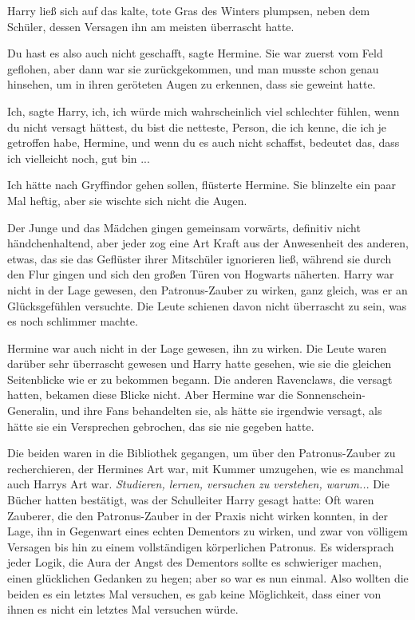 Harry ließ sich auf das kalte, tote Gras des Winters plumpsen, neben dem
Schüler, dessen Versagen ihn am meisten überrascht hatte.

\glqq{}Du hast es also auch nicht geschafft\grqq{}, sagte Hermine. Sie war zuerst
vom Feld geflohen, aber dann war sie zurückgekommen, und man musste schon genau
hinsehen, um in ihren geröteten Augen zu erkennen, dass sie geweint hatte.

\glqq{}Ich\grqq{}, sagte Harry, \glqq{}ich, ich würde mich wahrscheinlich viel
schlechter fühlen, wenn du nicht versagt hättest, du bist die netteste, Person,
die ich kenne, die ich je getroffen habe, Hermine, und wenn du es auch nicht
schaffst, bedeutet das, dass ich vielleicht noch, gut bin ...\grqq{}

\glqq{}Ich hätte nach Gryffindor gehen sollen\grqq{}, flüsterte Hermine. Sie
blinzelte ein paar Mal heftig, aber sie wischte sich nicht die Augen.

Der Junge und das Mädchen gingen gemeinsam vorwärts, definitiv nicht
händchenhaltend, aber jeder zog eine Art Kraft aus der Anwesenheit des anderen,
etwas, das sie das Geflüster ihrer Mitschüler ignorieren ließ, während sie durch
den Flur gingen und sich den großen Türen von Hogwarts näherten. Harry war nicht
in der Lage gewesen, den Patronus-Zauber zu wirken, ganz gleich, was er an
Glücksgefühlen versuchte. Die Leute schienen davon nicht überrascht zu sein, was
es noch schlimmer machte.

Hermine war auch nicht in der Lage gewesen, ihn zu wirken. Die Leute waren
darüber sehr überrascht gewesen und Harry hatte gesehen, wie sie die gleichen
Seitenblicke wie er zu bekommen begann. Die anderen Ravenclaws, die versagt
hatten, bekamen diese Blicke nicht. Aber Hermine war die Sonnenschein-Generalin,
und ihre Fans behandelten sie, als hätte sie irgendwie versagt, als hätte sie
ein Versprechen gebrochen, das sie nie gegeben hatte.

Die beiden waren in die Bibliothek gegangen, um über den Patronus-Zauber zu
recherchieren, der Hermines Art war, mit Kummer umzugehen, wie es manchmal auch
Harrys Art war. \emph{Studieren, lernen, versuchen zu verstehen, warum..}. Die
Bücher hatten bestätigt, was der Schulleiter Harry gesagt hatte: Oft waren
Zauberer, die den Patronus-Zauber in der Praxis nicht wirken konnten, in der
Lage, ihn in Gegenwart eines echten Dementors zu wirken, und zwar von völligem
Versagen bis hin zu einem vollständigen körperlichen Patronus. Es widersprach
jeder Logik, die Aura der Angst des Dementors sollte es schwieriger machen,
einen glücklichen Gedanken zu hegen; aber so war es nun einmal. Also wollten die
beiden es ein letztes Mal versuchen, es gab keine Möglichkeit, dass einer von
ihnen es nicht ein letztes Mal versuchen würde.


